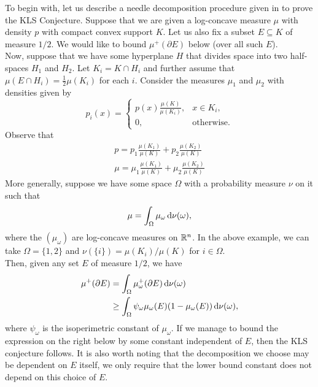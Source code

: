 \documentclass{article}
\begin{document}
		To begin with, let us describe a needle decomposition procedure given in \cite{leevempala2018klssurvey} to prove the KLS Conjecture. Suppose that we are given a log-concave measure $\mu$ with density $p$ with compact convex support $K$. Let us also fix a subset $E\subseteq K$ of measure $1/2$. We would like to bound $\mu^+(\partial E)$ below (over all such $E$).\\
		Now, suppose that we have some hyperplane $H$ that divides space into two half-spaces $H_1$ and $H_2$. Let $K_i = K \cap H_i$ and further assume that $\mu(E \cap H_i) = \frac{1}{2}\mu(K_i)$ for each $i$. Consider the measures $\mu_1$ and $\mu_2$ with densities given by
		\[ p_i(x) =
		\begin{cases}
			p(x) \frac{\mu(K)}{\mu(K_i)}, & x \in K_i, \\
			0, & \text{otherwise.}
		\end{cases} \]
		Observe that
		\begin{equation}
			\label{eqn 1}
			\begin{gathered}
				p = p_1 \frac{\mu(K_1)}{\mu(K)} + p_2 \frac{\mu(K_2)}{\mu(K)} \\
				\mu = \mu_1 \frac{\mu(K_1)}{\mu(K)} + \mu_2 \frac{\mu(K_2)}{\mu(K)}
			\end{gathered}
		\end{equation}
		More generally, suppose we have some space $\Omega$ with a probability measure $\nu$ on it such that
		\begin{equation}
			\label{eqn 2: disintegration}
			\mu = \int_\Omega \mu_{\omega} \operatorname{d}\!{\nu}(\omega),
		\end{equation}
		where the $(\mu_\omega)$ are log-concave measures on $\mathbb{R}^n$. In the above example, we can take $\Omega = \{1,2\}$ and $\nu(\{i\}) = \mu(K_i) / \mu(K)$ for $i\in\Omega$.\\
		Then, given any set $E$ of measure $1/2$, we have
		\begin{align}
			\mu^+(\partial E) &= \int_{\Omega} \mu_\omega^+(\partial E) \operatorname{d}\!{\nu}(\omega)  \nonumber \\
				&\geq \int_\Omega \psi_\omega \mu_\omega(E) (1-\mu_\omega(E)) \operatorname{d}\!{\nu}(\omega), \label{eqn 4}
		\end{align}
		where $\psi_\omega$ is the isoperimetric constant of $\mu_\omega$. If we manage to bound the expression on the right below by some constant independent of $E$, then the KLS conjecture follows. It is also worth noting that the decomposition we choose may be dependent on $E$ itself, we only require that the lower bound constant does not depend on this choice of $E$.
\end{document}
